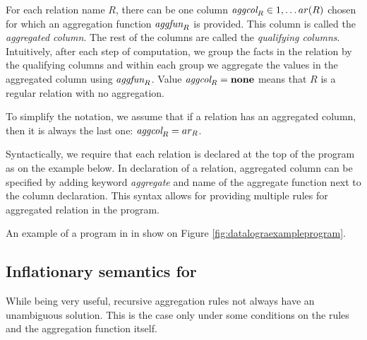 For each relation name $R$, there can be one column $\textit{aggcol}_R \in {1, \dots ar(R)}$ chosen for which an aggregation function $\textit{aggfun}_R$ is provided. This column is called the \emph{aggregated column}. The rest of the columns are called the \emph{qualifying columns}. Intuitively, after each step of computation, we group the facts in the relation by the qualifying columns and within each group we aggregate the values in the aggregated column using $\textit{aggfun}_R$. Value $\textit{aggcol}_R = \bf{none}$ means that $R$ is a regular relation with no aggregation.

To simplify the notation, we assume that if a relation has an aggregated column, then it is always the last one: $\textit{aggcol}_R = ar_R$.

Syntactically, we require that each relation is declared at the top of the program as on the example below.
In declaration of a relation, aggregated column can be specified by adding keyword \textit{aggregate} and name of the aggregate function next to the column declaration. This syntax allows for providing multiple rules for aggregated relation in the program.

An example of a program in \datalogra in show on Figure \ref{fig:datalograexampleprogram}.

\begin{figure}[h!]
\end{figure}\label{fig:datalograexampleprogram}


\subsection{Inflationary semantics for \datalogra}
While being very useful, recursive aggregation rules not always have an unambiguous solution. This is the case only under some conditions on the rules and the aggregation function itself.

